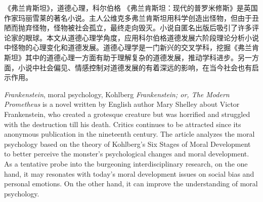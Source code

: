 
\begin{abstractzh}{《弗兰肯斯坦》，道德心理，科尔伯格}
\vspace{12pt}《弗兰肯斯坦：现代的普罗米修斯》是英国作家玛丽\textperiodcentered{}雪莱的著名小说。主人公维克多\textperiodcentered{}弗兰肯斯坦用科学创造出怪物，但由于丑陋而抛弃怪物，怪物被社会孤立，最终走向毁灭。小说自匿名出版后吸引了许多评论家的眼球。本文从道德心理学角度，应用科尔伯格道德发展六阶段理论分析小说中怪物的心理变化和道德发展。道德心理学是一门新兴的交叉学科，挖掘《弗兰肯斯坦》其中的道德心理一方面有助于理解复杂的道德发展，推动学科进步。另一方面，小说中社会偏见、情感控制对道德发展的有着深远的影响，在当今社会也有启示作用。

\end{abstractzh}

\begin{abstracten}{\textit{Frankenstein}, moral psychology, Kohlberg}
\vspace{12pt}\textit{Frankenstein; or, The Modern Prometheus} is a novel written by English author Mary Shelley about Victor Frankenstein, who created a grotesque creature but was horrified and struggled with the destruction till his death. Critics continues to be attracted since its anonymous publication in the nineteenth century. The article analyzes the moral psychology based on the theory of Kohlberg's Six Stages of Moral Development to better perceive the monster's psychological changes and moral development. As a tentative probe into the burgeoning interdisciplinary research, on the one hand, it may resonates with today's moral development issues on social bias and personal emotions. On the other hand, it can improve the understanding of moral psychology.
\end{abstracten}
